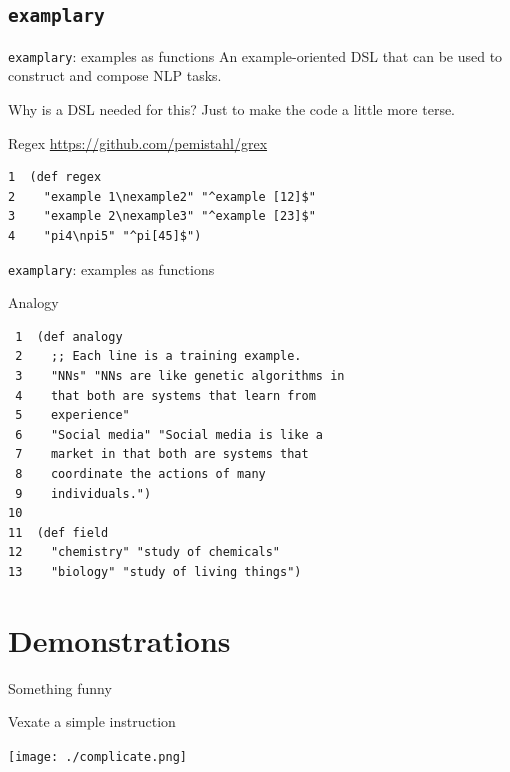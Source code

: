 \documentclass[presentation]{beamer}
\begin{document}
\subsection{\texttt{examplary}}
\label{sec:orge3aacbf}
\begin{frame}[label={sec:orgede8023},fragile]{\texttt{examplary}: examples as functions}
 An example-oriented DSL that can be used to
construct and compose NLP tasks.

Why is a DSL needed for this? Just to make the
code a little more terse.

\begin{block}{Regex}
\url{https://github.com/pemistahl/grex}

{\footnotesize
\begin{verbatim}
1  (def regex
2    "example 1\nexample2" "^example [12]$"
3    "example 2\nexample3" "^example [23]$"
4    "pi4\npi5" "^pi[45]$")
\end{verbatim}
}
\end{block}
\end{frame}

\begin{frame}[label={sec:orgde0e340},fragile]{\texttt{examplary}: examples as functions}
 \begin{block}{Analogy}
{\footnotesize
\begin{verbatim}
 1  (def analogy
 2    ;; Each line is a training example.
 3    "NNs" "NNs are like genetic algorithms in
 4    that both are systems that learn from
 5    experience"
 6    "Social media" "Social media is like a
 7    market in that both are systems that
 8    coordinate the actions of many
 9    individuals.")
10  
11  (def field
12    "chemistry" "study of chemicals"
13    "biology" "study of living things")
\end{verbatim}
}
\end{block}
\end{frame}

\section{Demonstrations}
\label{sec:org172a20b}
\begin{frame}[label={sec:org31ce526}]{Something funny}
\begin{block}{Vexate a simple instruction}
\begin{center}
\texttt{[image: ./complicate.png]}
\end{center}
\end{block}
\end{frame}
\end{document}
